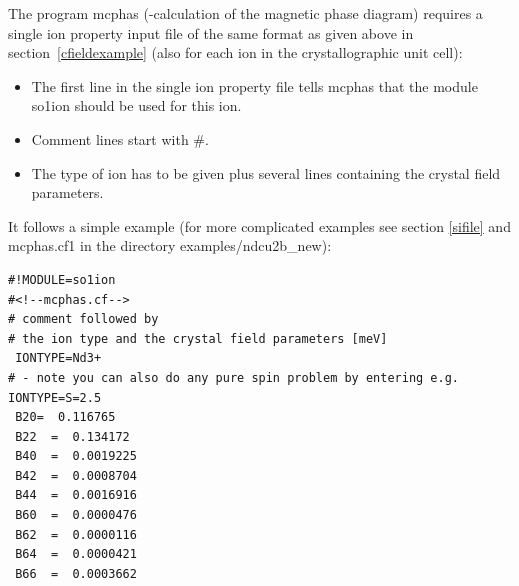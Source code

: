 The program {\prg mcphas} (-calculation of the magnetic phase diagram) 
requires a single ion
property input file of the same format as given above in
section~\ref{cfieldexample} (also for each ion in the
crystallographic unit cell):

\begin{itemize}
\item The first line in the single ion property file tells {\prg mcphas} that the module
{\prg so1ion} should be used for this ion. 
\item Comment lines start with \#. 
\item The type of ion has to be given plus
several lines containing the crystal field parameters. 
\end{itemize}

It follows a simple  example (for more complicated examples see section \ref{sifile} and 
{\prg mcphas.cf1} in the 
directory {\prg examples/ndcu2b\_new}):


\begin{verbatim}
#!MODULE=so1ion
#<!--mcphas.cf-->
# comment followed by
# the ion type and the crystal field parameters [meV]
 IONTYPE=Nd3+
# - note you can also do any pure spin problem by entering e.g. IONTYPE=S=2.5 
 B20=  0.116765                                           
 B22  =  0.134172                                           
 B40  =  0.0019225                                          
 B42  =  0.0008704                                          
 B44  =  0.0016916                                          
 B60  =  0.0000476                                          
 B62  =  0.0000116                                          
 B64  =  0.0000421                                          
 B66  =  0.0003662                                          
\end{verbatim}


